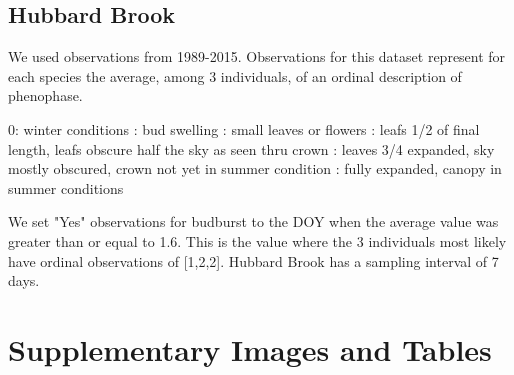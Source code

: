 \subsection{Hubbard Brook} \newline
We used observations from 1989-2015. Observations for this dataset represent for each species the average, among 3 individuals, of an ordinal description of phenophase. \newline

0: winter conditions : bud swelling : small leaves or flowers : leafs 1/2 of final length, leafs obscure half the sky as seen thru crown : leaves 3/4 expanded, sky mostly obscured, crown not yet in summer condition : fully expanded, canopy in summer conditions \newline

We set "Yes" observations for budburst to the DOY when the average value was greater than or equal to 1.6. This is the value where the 3 individuals most likely have ordinal observations of [1,2,2]. Hubbard Brook has a sampling interval of 7 days.

\section{Supplementary Images and Tables}



